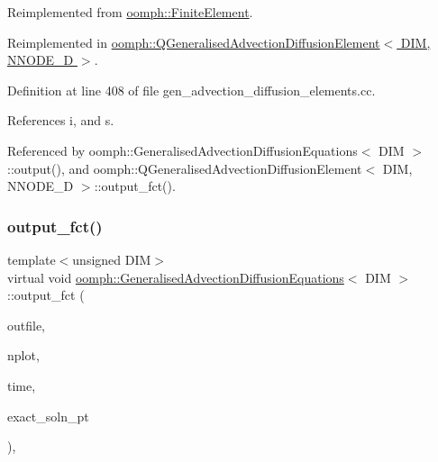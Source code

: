 Reimplemented from \hyperlink{classoomph_1_1FiniteElement_a22b695c714f60ee6cd145be348042035}{oomph\+::\+Finite\+Element}.



Reimplemented in \hyperlink{classoomph_1_1QGeneralisedAdvectionDiffusionElement_ad45f14c0a13af6ac3cefd0a065bcec7c}{oomph\+::\+Q\+Generalised\+Advection\+Diffusion\+Element$<$ D\+I\+M, N\+N\+O\+D\+E\+\_\+D $>$}.



Definition at line 408 of file gen\+\_\+advection\+\_\+diffusion\+\_\+elements.\+cc.



References i, and s.



Referenced by oomph\+::\+Generalised\+Advection\+Diffusion\+Equations$<$ D\+I\+M $>$\+::output(), and oomph\+::\+Q\+Generalised\+Advection\+Diffusion\+Element$<$ D\+I\+M, N\+N\+O\+D\+E\+\_\+D $>$\+::output\+\_\+fct().

\mbox{\label{classoomph_1_1GeneralisedAdvectionDiffusionEquations_a41914c83c67c4de8d2d504c918e04872}} 
\subsubsection{\texorpdfstring{output\+\_\+fct()}{output\_fct()}\hspace{0.1cm}{\footnotesize\ttfamily [2/2]}}
{\footnotesize\ttfamily template$<$unsigned D\+IM$>$ \\
virtual void \hyperlink{classoomph_1_1GeneralisedAdvectionDiffusionEquations}{oomph\+::\+Generalised\+Advection\+Diffusion\+Equations}$<$ D\+IM $>$\+::output\+\_\+fct (\begin{DoxyParamCaption}\item[{std\+::ostream \&}]{outfile,  }\item[{const unsigned \&}]{nplot,  }\item[{const double \&}]{time,  }\item[{\hyperlink{classoomph_1_1FiniteElement_ad4ecf2b61b158a4b4d351a60d23c633e}{Finite\+Element\+::\+Unsteady\+Exact\+Solution\+Fct\+Pt}}]{exact\+\_\+soln\+\_\+pt }\end{DoxyParamCaption})\hspace{0.3cm}{\ttfamily [inline]}, {\ttfamily [virtual]}}



